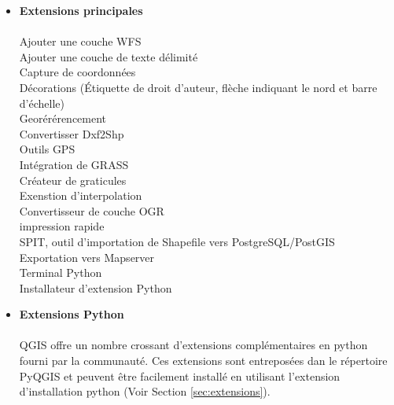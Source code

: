 \begin{itemize}
\item \textbf{Extensions principales}
\\ \\ Ajouter une couche WFS 
\\ Ajouter une couche de texte d\'elimit\'e
\\ Capture de coordonn\'ees
\\ D\'ecorations (\'Etiquette de droit d'auteur, fl\`eche indiquant le nord et barre d'\'echelle)
\\ Geor\'er\'erencement
\\ Convertisser Dxf2Shp 
\\ Outils GPS 
\\ Int\'egration de GRASS
\\ Cr\'eateur de graticules
\\ Exenstion d'interpolation
\\ Convertisseur de couche OGR
\\ impression rapide
\\ SPIT, outil d'importation de Shapefile vers PostgreSQL/PostGIS
\\ Exportation vers Mapserver
\\ Terminal Python
\\ Installateur d'extension Python
\\ \item \textbf{Extensions Python}
\\ \\ QGIS offre un nombre crossant d'extensions compl\'ementaires en python fourni par la communaut\'e. Ces extensions sont entrepos\'ees dan le r\'epertoire PyQGIS et peuvent \^etre facilement install\'e en utilisant l'extension d'installation python (Voir Section \ref{sec:extensions}).
\end{itemize}
